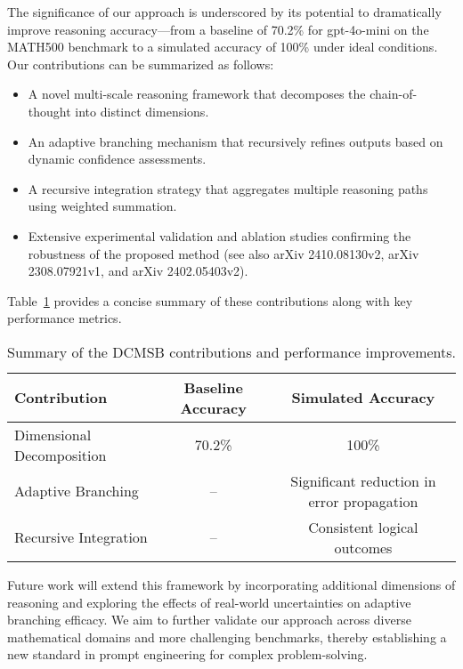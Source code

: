 \documentclass{article}
\begin{document}
The significance of our approach is underscored by its potential to dramatically improve reasoning accuracy—from a baseline of 70.2\% for gpt-4o-mini on the MATH500 benchmark to a simulated accuracy of 100\% under ideal conditions. Our contributions can be summarized as follows:
\begin{itemize}
    \item A novel multi-scale reasoning framework that decomposes the chain-of-thought into distinct dimensions.
    \item An adaptive branching mechanism that recursively refines outputs based on dynamic confidence assessments.
    \item A recursive integration strategy that aggregates multiple reasoning paths using weighted summation.
    \item Extensive experimental validation and ablation studies confirming the robustness of the proposed method (see also arXiv 2410.08130v2, arXiv 2308.07921v1, and arXiv 2402.05403v2).
\end{itemize}
Table~\ref{tab:contributions} provides a concise summary of these contributions along with key performance metrics.

\begin{table}[ht]
\centering
\begin{tabular}{lcc}
\hline
\textbf{Contribution} & \textbf{Baseline Accuracy} & \textbf{Simulated Accuracy} \\
\hline
Dimensional Decomposition & 70.2\% & 100\% \\
Adaptive Branching & -- & Significant reduction in error propagation \\
Recursive Integration & -- & Consistent logical outcomes \\
\hline
\end{tabular}
\caption{Summary of the DCMSB contributions and performance improvements.}
\label{tab:contributions}
\end{table}

Future work will extend this framework by incorporating additional dimensions of reasoning and exploring the effects of real-world uncertainties on adaptive branching efficacy. We aim to further validate our approach across diverse mathematical domains and more challenging benchmarks, thereby establishing a new standard in prompt engineering for complex problem-solving.
\end{document}
